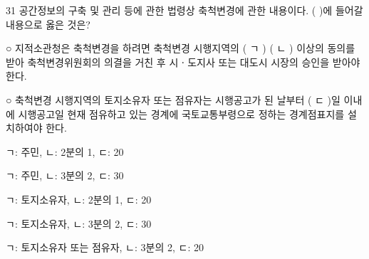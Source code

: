 \begin{question}{31}
공간정보의 구축 및 관리 등에 관한 법령상 축척변경에 관한 내용이다. ( )에 들어갈 내용으로 옳은 것은?
\begin{framedtext}
○ 지적소관청은 축척변경을 하려면 축척변경 시행지역의 ( ㄱ ) ( ㄴ ) 이상의 동의를 받아 축척변경위원회의 의결을 거친 후 시ㆍ도지사 또는 대도시 시장의 승인을 받아야 한다. \par
○ 축척변경 시행지역의 토지소유자 또는 점유자는 시행공고가 된 날부터 ( ㄷ )일 이내에 시행공고일 현재 점유하고 있는 경계에 국토교통부령으로 정하는 경계점표지를 설치하여야 한다.
\end{framedtext}
\begin{choices}
  \item ㄱ: 주민, ㄴ: 2분의 1, ㄷ: 20
  \item ㄱ: 주민, ㄴ: 3분의 2, ㄷ: 30
  \item ㄱ: 토지소유자, ㄴ: 2분의 1, ㄷ: 20
  \item ㄱ: 토지소유자, ㄴ: 3분의 2, ㄷ: 30
  \item ㄱ: 토지소유자 또는 점유자, ㄴ: 3분의 2, ㄷ: 20
\end{choices}
\end{question}
